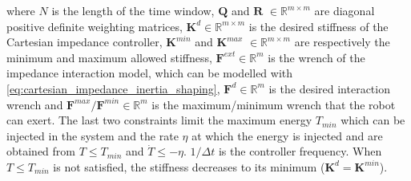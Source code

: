 where $N$ is the length of the time window, $\boldsymbol{Q}$ and $\boldsymbol{R}$ $\in \mathbb{R}^{m\times m}$ are diagonal positive definite weighting matrices, $\boldsymbol{K}^d \in \mathbb{R}^{m\times m}$ is the desired stiffness of the Cartesian impedance controller, $\boldsymbol{K}^{min}$ and $\boldsymbol{K}^{max}$ $\in \mathbb{R}^{m\times m}$ are respectively the minimum and maximum allowed stiffness, $\boldsymbol{F}^{ext} \in \mathbb{R}^{m}$ is the wrench of the impedance interaction model, which can be modelled with \eqref{eq:cartesian_impedance_inertia_shaping}, $\boldsymbol{F}^d \in \mathbb{R}^{m}$ is the desired interaction wrench and $\boldsymbol{F}^{max}/\boldsymbol{F}^{min} \in \mathbb{R}^{m}$ is the maximum/minimum wrench that the robot can exert. %
The last two constraints limit the maximum energy $T_{min}$ which can be injected in the system and the rate $\eta$ at which the energy is injected and are obtained from $T \le T_{min}$ and $\dot{T} \le -\eta$. 
$1/\Delta t$ is the controller frequency. 
When $T \le T_{min}$ is not satisfied, the stiffness decreases to its minimum ($\boldsymbol{K}^d = \boldsymbol{K}^{min}$). 


